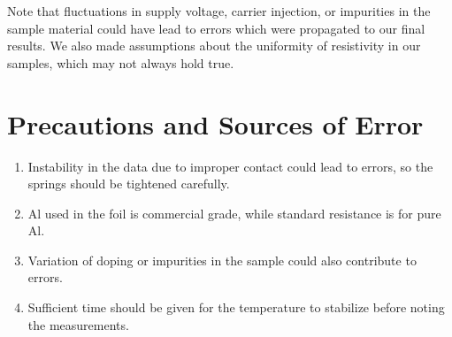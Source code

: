 Note that fluctuations in supply voltage, carrier injection, or impurities in the sample material could have lead to errors which were propagated to our final results.
We also made assumptions about the uniformity of resistivity in our samples, which may not always hold true.

\section{Precautions and Sources of Error}

    \begin{enumerate}
        \item Instability in the data due to improper contact could lead to errors, so the springs should be tightened carefully.
        \item Al used in the foil is commercial grade, while standard resistance is for pure Al.
        \item Variation of doping or impurities in the sample could also contribute to errors.
        \item Sufficient time should be given for the temperature to stabilize before noting the measurements.
    \end{enumerate}
